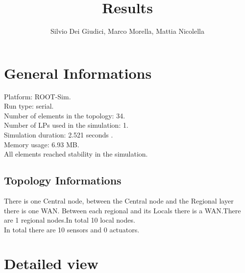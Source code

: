 \documentclass{article}
\title{Results}
\author{Silvio Dei Giudici, Marco Morella, Mattia Nicolella}
\begin{document}
\maketitle
\section{General Informations}Platform: ROOT-Sim.\\Run type: serial.\\ Number of elements in the topology: 34.\\ Number of LPs used in the simulation: 1.\\ Simulation duration: 2.521 seconds .\\ Memory usage: 6.93 MB.\\ All elements reached stability in the simulation. 
\subsection{Topology Informations}There is one Central node, between the Central node and the Regional layer there is one WAN. Between each regional and its Locals there is a WAN.\newline There are 1 regional nodes.In total 10
 local nodes.\\In total there are 10 sensors and 0 actuators.
\section{Detailed view}
\end{document}
